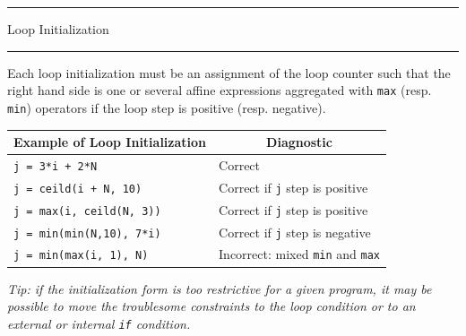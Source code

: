 \documentclass[landscape,a4paper]{article}
\def\titre#1{\begin{center}\hrule\vspace{0.1cm}#1
\vspace{0.07cm}\hrule\end{center}}
\begin{document}
\begin{multicols}{3}
\begin{center}
\end{center}


\titre{Loop Initialization}

\begin{small}
Each loop initialization must be an assignment of the loop counter such that the
right hand side is one or several affine expressions aggregated with {\tt max}
(resp. {\tt min}) operators if the loop step is positive (resp. negative).

\vspace{0.3cm}
\begin{tabular}{p{4cm}|p{4.39cm}}
\multicolumn{1}{c|}{Example of Loop Initialization} &\multicolumn{1}{c}{Diagnostic}\\
\hline
{\tt j = 3*i + 2*N} & Correct\\
\hline
{\tt j = ceild(i + N, 10)} & Correct if {\tt j} step is positive\\
\hline
{\tt j = max(i, ceild(N, 3))} & Correct if {\tt j} step is positive\\
\hline
{\tt j = min(min(N,10), 7*i)} & Correct if {\tt j} step is negative\\
\hline
\hline
{\tt j = min(max(i, 1), N)} & Incorrect: mixed {\tt min} and {\tt max}
\end{tabular}

\vspace{0.3cm}
\textit{Tip: if the initialization form is too restrictive for a given
program, it may be possible to move the troublesome constraints to the
loop condition or to an external or internal {\tt if} condition.}
\end{small}


\end{multicols}
\end{document}

